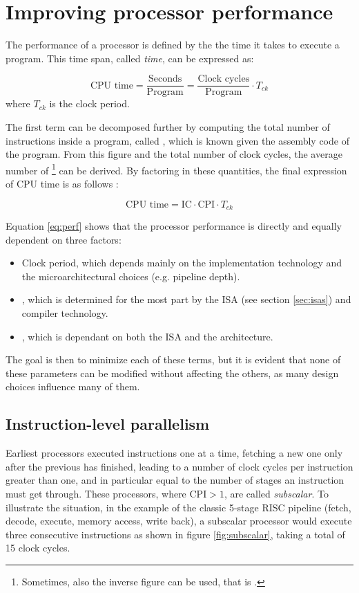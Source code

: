 \chapter{Improving processor performance}
The performance of a processor is defined by the the time it takes to execute a program. This time span, called \emph{ time}, can be expressed as:

\begin{equation*}
  \text{CPU time} = \frac{\text{Seconds}}{\text{Program}} = \frac{\text{Clock cycles}}{\text{Program}} \cdot T_{ck}
\end{equation*}
where $T_{ck}$ is the clock period.

The first term can be decomposed further by computing the total number of instructions inside a program, called , which is known given the assembly code of the program. From this figure and the total number of clock cycles, the average number of \footnote{Sometimes, also the inverse figure can be used, that is .} can be derived. By factoring in these quantities, the final expression of \ac{CPU} time is as follows \cite[p.~53]{hennessy17}:

\begin{equation}\label{eq:perf}
  \text{CPU time} = \text{IC} \cdot \text{CPI} \cdot T_{ck} 
\end{equation}

Equation \eqref{eq:perf} shows that the processor performance is directly and equally dependent on three factors:
\begin{itemize}
  \item Clock period, which depends mainly on the implementation technology and the microarchitectural choices (e.g. pipeline depth).
  \item {}, which is determined for the most part by the \ac{ISA} (see section \ref{sec:isas}) and compiler technology.
  \item {}, which is dependant on both the \ac{ISA} and the architecture.
\end{itemize}
The goal is then to minimize each of these terms, but it is evident that none of these parameters can be modified without affecting the others, as many design choices influence many of them.

\section{Instruction-level parallelism}\label{sec:ilp}
Earliest processors executed instructions one at a time, fetching a new one only after the previous has finished, leading to a number of clock cycles per instruction greater than one, and in particular equal to the number of stages an instruction must get through. These processors, where $\text{CPI} > 1$, are called \emph{subscalar}. To illustrate the situation, in the example of the classic 5-stage RISC pipeline (fetch, decode, execute, memory access, write back), a subscalar processor would execute three consecutive instructions as shown in figure \ref{fig:subscalar}, taking a total of 15 clock cycles.

